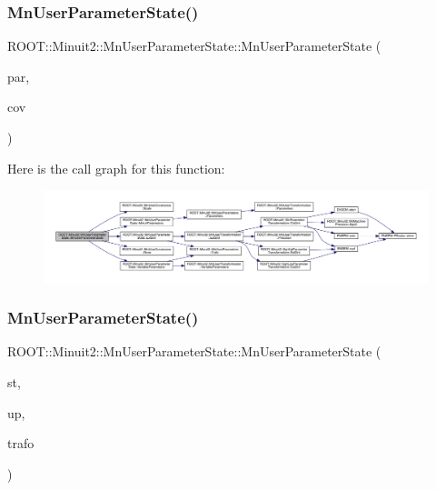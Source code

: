 \subsubsection{\texorpdfstring{MnUserParameterState()}{MnUserParameterState()}\hspace{0.1cm}{\footnotesize\ttfamily [6/24]}}
{\footnotesize\ttfamily R\+O\+O\+T\+::\+Minuit2\+::\+Mn\+User\+Parameter\+State\+::\+Mn\+User\+Parameter\+State (\begin{DoxyParamCaption}\item[{const \mbox{\hyperlink{classROOT_1_1Minuit2_1_1MnUserParameters}{Mn\+User\+Parameters}} \&}]{par,  }\item[{const \mbox{\hyperlink{classROOT_1_1Minuit2_1_1MnUserCovariance}{Mn\+User\+Covariance}} \&}]{cov }\end{DoxyParamCaption})}

Here is the call graph for this function\+:
\nopagebreak
\begin{figure}[H]
\begin{center}
\leavevmode
\includegraphics[width=350pt]{d3/de0/classROOT_1_1Minuit2_1_1MnUserParameterState_aafeef85943691c9736a58d6a7830259a_cgraph}
\end{center}
\end{figure}
\mbox{\label{classROOT_1_1Minuit2_1_1MnUserParameterState_a8214c3f41958849f1aaae4865bb5b129}} 
\subsubsection{\texorpdfstring{MnUserParameterState()}{MnUserParameterState()}\hspace{0.1cm}{\footnotesize\ttfamily [7/24]}}
{\footnotesize\ttfamily R\+O\+O\+T\+::\+Minuit2\+::\+Mn\+User\+Parameter\+State\+::\+Mn\+User\+Parameter\+State (\begin{DoxyParamCaption}\item[{const \mbox{\hyperlink{classROOT_1_1Minuit2_1_1MinimumState}{Minimum\+State}} \&}]{st,  }\item[{double}]{up,  }\item[{const \mbox{\hyperlink{classROOT_1_1Minuit2_1_1MnUserTransformation}{Mn\+User\+Transformation}} \&}]{trafo }\end{DoxyParamCaption})}



